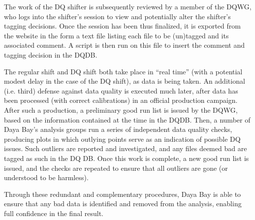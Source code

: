 \documentclass[../thesis.tex]{subfiles}
\begin{document}
The work of the DQ shifter is subsequently reviewed by a member of the DQWG, who logs into the shifter's session to view and potentially alter the shifter's tagging decisions. Once the session has been thus finalized, it is exported from the website in the form a text file listing each file to be (un)tagged and its associated comment. A script is then run on this file to insert the comment and tagging decision in the DQDB.

The regular shift and DQ shift both take place in ``real time'' (with a potential modest delay in the case of the DQ shift), as data is being taken. An additional (i.e. third) defense against data quality is executed much later, after data has been processed (with correct calibrations) in an official production campaign. After such a production, a preliminary good run list is issued by the DQWG, based on the information contained at the time in the DQDB. Then, a number of Daya Bay's analysis groups run a series of independent data quality checks, producing plots in which outlying points serve as an indication of possible DQ issues. Such outliers are reported and investigated, and any files deemed bad are tagged as such in the DQ DB. Once this work is complete, a new good run list is issued, and the checks are repeated to ensure that all outliers are gone (or understood to be harmless).

Through these redundant and complementary procedures, Daya Bay is able to ensure that any bad data is identified and removed from the analysis, enabling full confidence in the final result.
\end{document}
